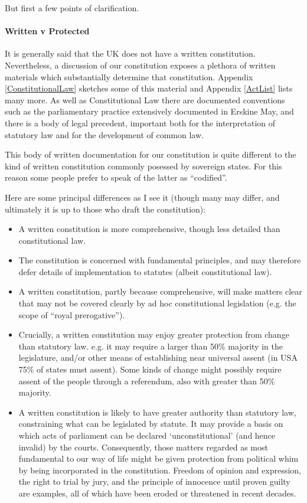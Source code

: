 \documentclass[14pt,titlepage]{extarticle}
\begin{document}
But first a few points of clarification.

\paragraph{Written v Protected}

It is generally said that the UK does not have a written constitution.
Nevertheless, a discussion of our constitution exposes a plethora of written materials which substantially determine that constitution.
Appendix \ref{ConstitutionalLaw} sketches some of this material and Appendix \ref{ActList} lists many more.
As well as Constitutional Law there are documented conventions such as the parliamentary practice extensively documented in Erskine May, and there is a body of legal precedent, important both for the interpretation of statutory law and for the development of common law.

This body of written documentation for our constitution is quite different to the kind of written constitution commonly posessed by sovereign states.
For this reason some people prefer to speak of the latter as ``codified''.

Here are some principal differences as I see it (though many may differ, and ultimately it is up to those who draft the constitution):

\begin{itemize}
\item A written constitution is more comprehensive, though less detailed than constitutional law.
\item The constitution is concerned with fundamental principles, and may therefore defer details of implementation to statutes (albeit constitutional law).
\item A written constitution, partly because comprehensive, will make matters clear that may not be covered clearly by ad hoc constitutional legislation (e.g. the scope of ``royal prerogative'').
\item Crucially, a written constitution may enjoy greater protection from change than statutory law.
  e.g. it may require a larger than 50\% majority in the legislature, and/or other means of establishing near universal assent (in USA 75\% of states must assent).
  Some kinds of change might possibly require assent of the people through a referendum, also with greater than 50\% majority.
  
\item A written constitution is likely to have greater authority than statutory law, constraining what can be legislated by statute.
  It may provide a basis on which acts of parliament can be declared `unconstitutional' (and hence invalid) by the courts.
  Consequently, those matters regarded as most fundamental to our way of life might be given protection from political whim by being incorporated in the constitution.
  Freedom of opinion and expression, the right to trial by jury, and the principle of innocence until proven guilty are examples, all of which have been eroded or threatened in recent decades. 
\end{itemize}
\end{document}
